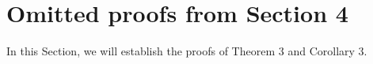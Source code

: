 \documentclass[twoside]{article}
\begin{document}



\section{Omitted proofs from Section 4}
In this Section, we will establish the proofs of Theorem 3 and Corollary 3. 
\end{document}

